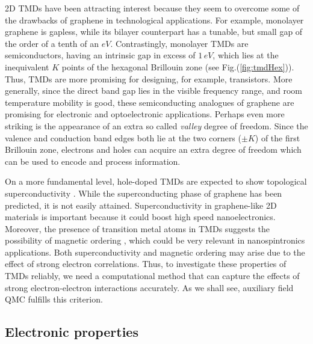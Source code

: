 \acl{2D} \acp{TMD} have been attracting interest because they seem to overcome some of the drawbacks of graphene in technological applications.
For example, monolayer graphene is gapless, while its bilayer counterpart has a tunable, but small gap of the order of a tenth of an $eV$.
Contrastingly, monolayer \acp{TMD} are semiconductors, having an intrinsic gap in excess of $1 \, eV$, which lies at the inequivalent $K$ points of the hexagonal Brillouin zone (see Fig.(\ref{fig:tmdHex})).
Thus, \acp{TMD} are more promising for designing, for example, transistors.
More generally, since the direct band gap lies in the visible frequency range, and room temperature mobility is good, these semiconducting analogues of graphene are promising for electronic and optoelectronic applications.
Perhaps even more striking is the appearance of an extra so called \emph{valley} degree of freedom.
Since the valence and conduction band edges both lie at the two corners ($\pm K$) of the first Brillouin zone, electrons and holes can acquire an extra degree of freedom which can be used to encode and process information.
 
On a more fundamental level, hole-doped \acp{TMD} are expected to show topological superconductivity \cite{hsu_topological_2017}.
While the superconducting phase of graphene has been predicted, it is not easily attained.
Superconductivity in graphene-like \ac{2D} materials is important because it could boost high speed nanoelectronics.
Moreover, the presence of transition metal atoms in \acp{TMD} suggests the possibility of magnetic ordering \cite{braz_valley_2017}, which could be very relevant in nanospintronics applications.
Both superconductivity and magnetic ordering may arise due to the effect of strong electron correlations.
Thus, to investigate these properties of \acp{TMD} reliably, we need a computational method that can  capture the effects of strong electron-electron interactions accurately.
As we shall see, auxiliary field \ac{QMC}  fulfills this criterion.

\subsection{Electronic properties}\label{subsec:electronic}

